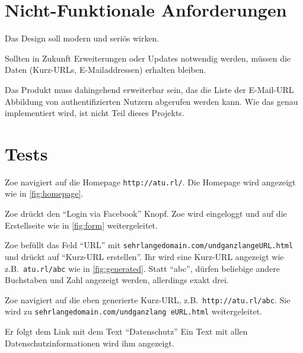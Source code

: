 \documentclass[parskip=full,11pt,twoside]{scrartcl}
\begin{document}
\section{Nicht-Funktionale Anforderungen}


Das Design soll modern und seriös wirken.


Sollten in Zukunft Erweiterungen oder Updates notwendig werden,
müssen die Daten (Kurz-URLs, E-Mailaddressen) erhalten bleiben.


Das Produkt muss dahingehend erweiterbar sein,
das die Liste der E-Mail-URL Abbildung von authentifizierten Nutzern
abgerufen werden kann.
Wie das genau implementiert wird, ist nicht Teil dieses Projekts.

\section{Tests}


{Zoe navigiert auf die Homepage \texttt{http://atu.rl/}.}
{Die Homepage wird angezeigt wie in \cref{fig:homepage}.}

%
{Zoe drückt den \enquote{Login via Facebook} Knopf.}%
{Zoe wird eingeloggt und auf die Erstellseite wie in \cref{fig:form} weitergeleitet.}

\teststep{}
{Zoe befüllt das Feld \enquote{URL} mit \texttt{sehrlangedomain.com/undganzlangeURL.html} und drückt auf \enquote{Kurz-URL erstellen}.}%
{Ihr wird eine Kurz-URL angezeigt wie z.B.\ \texttt{atu.rl/abc}
 wie in \cref{fig:generated}.
 Statt \enquote{abc}, dürfen beliebige andere Buchstaben und Zahl angezeigt werden, allerdings exakt drei.}

\teststep{}
{Zoe navigiert auf die eben generierte Kurz-URL, z.B.\ \texttt{http://atu.rl/abc}.}
{Sie wird zu \texttt{sehrlangedomain.com/undganzlang  eURL.html} weitergeleitet.}


{Er folgt dem Link mit dem Text \enquote{Datenschutz}}
{Ein Text mit allen Datenschutzinformationen wird ihm angezeigt.}
\end{document}
